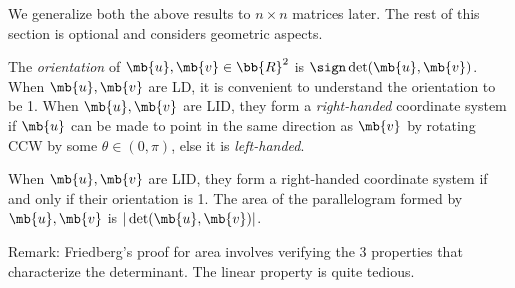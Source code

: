 We generalize both the above results to $n \times n$ matrices later. The rest of this section is optional and considers geometric aspects.
\begin{defn}
The \emph{orientation} of $\mb{u},\mb{v}\in \bb{R}^2$ is $\sign \det(\mb{u},\mb{v})$. When $\mb{u},\mb{v}$ are LD, it is convenient to understand the orientation to be 1. When $\mb{u},\mb{v}$ are LID, they form a \emph{right-handed} coordinate system if $\mb{u}$ can be made to point in the same direction as $\mb{v}$ by rotating CCW by some $\theta \in (0,\pi)$, else it is \emph{left-handed}.
\end{defn}
\begin{exer}
When $\mb{u},\mb{v}$ are LID, they form a right-handed coordinate system if and only if their orientation is 1.
The area of the parallelogram formed by $\mb{u},\mb{v}$ is $|\det(\mb{u},\mb{v}) |$.
\end{exer}
Remark: Friedberg's proof for area involves verifying the 3 properties that characterize the determinant. The linear property is quite tedious.

